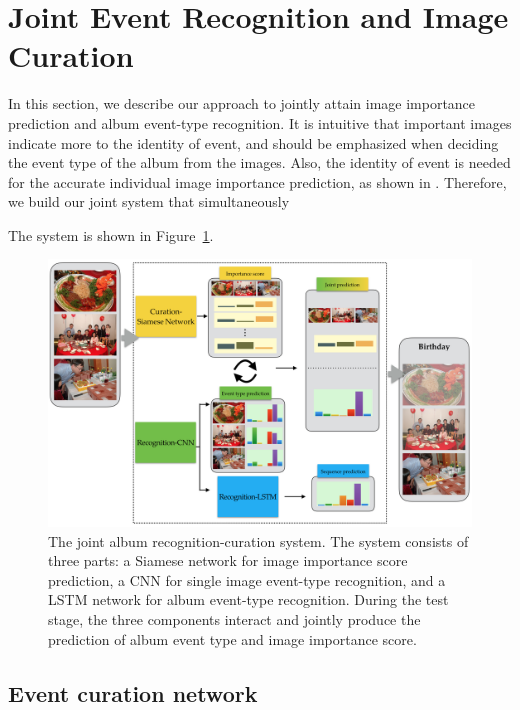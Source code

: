 \documentclass[runningheads]{llncs}
\begin{document}
\section{Joint Event Recognition and Image Curation}
\label{approach}
In this section, we describe our approach to jointly attain image importance prediction and album event-type recognition. It is intuitive that important images indicate more to the identity of event, and should be emphasized when deciding the event type of the album from the images. Also, the identity of event is needed for the accurate individual image importance prediction, as shown in \cite{CVPR}. Therefore, we build our joint system that simultaneously 

The system is shown in Figure~\ref{figure1}. 



\begin{figure}
\centering
\includegraphics[width=4.8in]{architecture}
\caption{The joint album recognition-curation system. The system consists of three parts: a Siamese network for image importance score prediction, a CNN for single image event-type recognition, and a LSTM network for album event-type recognition. During the test stage, the three components interact and jointly produce the prediction of album event type and image importance score.}
\label{figure1}
\vspace{-0.3in}
\end{figure}

\subsection{Event curation network}
\label{curation_section}
\end{document}
